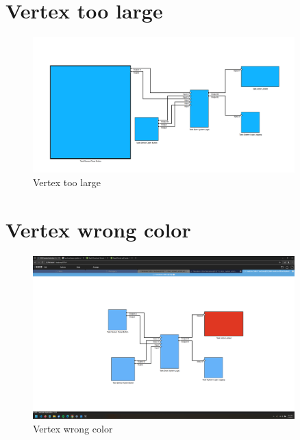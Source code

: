 \documentclass{article}
\begin{document}
\section{Vertex too large}
\begin{figure}[H]
    \centering
    \includegraphics[width=0.9\textwidth]{images/vertex_too_large.png}
    \caption{Vertex too large}
\end{figure}
\newpage

\section{Vertex wrong color}
\begin{figure}[H]
    \centering
    \includegraphics[width=0.9\textwidth]{images/vertex_wrong_color.png}
    \caption{Vertex wrong color}
\end{figure}
\newpage
\end{document}
